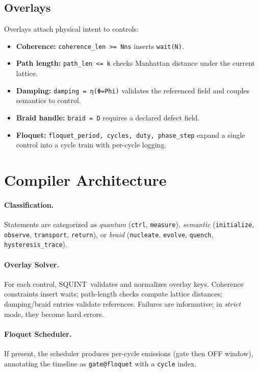 \documentclass[11pt]{article}
\newcommand{\SQUINT}{\textsc{SQUINT}}
\begin{document}
\subsection{Overlays}
Overlays attach physical intent to controls:
\begin{itemize}[leftmargin=1.3em]
  \item \textbf{Coherence:} \verb|coherence_len >= Nns| inserts \verb|wait(N)|.
  \item \textbf{Path length:} \verb|path_len <= k| checks Manhattan distance under the current lattice.
  \item \textbf{Damping:} \verb|damping = η(Φ=Phi)| validates the referenced field and couples semantics to control.
  \item \textbf{Braid handle:} \verb|braid = D| requires a declared defect field.
  \item \textbf{Floquet:} \verb|floquet_period, cycles, duty, phase_step| expand a single control into a cycle train with per-cycle logging.
\end{itemize}

\section{Compiler Architecture}
\label{sec:compiler}
\paragraph{Classification.} Statements are categorized as \emph{quantum} (\texttt{ctrl}, \texttt{measure}), \emph{semantic} (\texttt{initialize}, \texttt{observe}, \texttt{transport}, \texttt{return}), or \emph{braid} (\texttt{nucleate}, \texttt{evolve}, \texttt{quench}, \texttt{hysteresis\_trace}).

\paragraph{Overlay Solver.} For each control, \SQUINT\ validates and normalizes overlay keys. Coherence constraints insert waits; path-length checks compute lattice distances; damping/braid entries validate references. Failures are informative; in \emph{strict} mode, they become hard errors.

\paragraph{Floquet Scheduler.} If present, the scheduler produces per-cycle emissions (gate then OFF window), annotating the timeline as \texttt{gate@floquet} with a \texttt{cycle} index.
\end{document}
